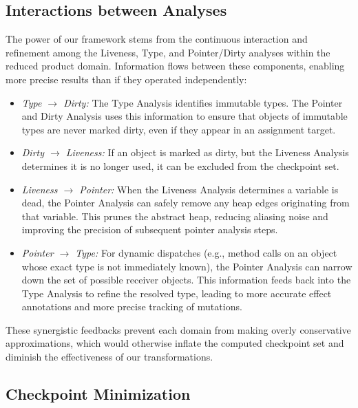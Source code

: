 \subsection{Interactions between Analyses}

The power of our framework stems from the continuous interaction and refinement among the Liveness, Type, and Pointer/Dirty analyses within the reduced product domain. Information flows between these components, enabling more precise results than if they operated independently:

\begin{itemize}
    \item \emph{Type $\rightarrow$ Dirty:} The Type Analysis identifies immutable types. The Pointer and Dirty Analysis uses this information to ensure that objects of immutable types are never marked dirty, even if they appear in an assignment target.
    \item \emph{Dirty $\rightarrow$ Liveness:} If an object is marked as dirty, but the Liveness Analysis determines it is no longer used, it can be excluded from the checkpoint set.
    \item \emph{Liveness $\rightarrow$ Pointer:} When the Liveness Analysis determines a variable is dead, the Pointer Analysis can safely remove any heap edges originating from that variable. This prunes the abstract heap, reducing aliasing noise and improving the precision of subsequent pointer analysis steps.
    \item \emph{Pointer $\rightarrow$ Type:} For dynamic dispatches (e.g., method calls on an object whose exact type is not immediately known), the Pointer Analysis can narrow down the set of possible receiver objects. This information feeds back into the Type Analysis to refine the resolved type, leading to more accurate effect annotations and more precise tracking of mutations.
\end{itemize}
These synergistic feedbacks prevent each domain from making overly conservative approximations, which would otherwise inflate the computed checkpoint set and diminish the effectiveness of our transformations.

\subsection{Checkpoint Minimization}

